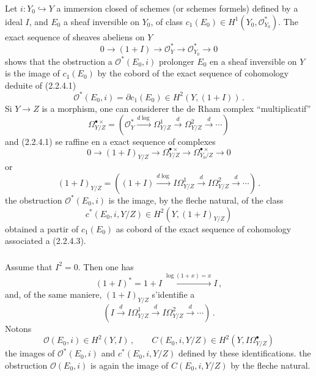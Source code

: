 \documentclass[12pt,a4paper]{article}
\theoremstyle{plain}
\theoremstyle{definition}
\theoremstyle{remark}
\begin{document}
Let $i : Y_0 \hookrightarrow Y$ a immersion closed of schemes (or schemes formels) defined by a ideal $I$, and $E_0$ a sheaf inversible on $Y_0$, of class $c_1(E_0) \in H^1(Y_0, \mathcal{O}_{Y_0}^*)$. The exact sequence of sheaves abeliens on $Y$
\begin{equation}\label{eq:2.2.4.1}
0 \longrightarrow (1+I) \longrightarrow \mathcal{O}_Y^* \longrightarrow \mathcal{O}_{Y_0}^* \longrightarrow 0
\end{equation}
shows that the obstruction a $\mathcal{O}^*(E_0, i)$ prolonger $E_0$ en a sheaf inversible on $Y$ is the image of $c_1(E_0)$ by the cobord of the exact sequence of cohomology deduite of (2.2.4.1)
\begin{equation}\label{eq:2.2.4.2}
\mathcal{O}^*(E_0, i) = \partial c_1(E_0) \in H^2(Y, (1+I))\,.\end{equation}
Si $Y \to Z$ is a morphism, one can considerer the de Rham complex ``multiplicatif''
\[
\Omega_{Y/Z}^{\bullet\times} = (\mathcal{O}_Y^* \xrightarrow{d\log} \Omega_{Y/Z}^1 \xrightarrow{d} \Omega_{Y/Z}^2 \xrightarrow{d} \cdots)
\]
and (2.2.4.1) se raffine en a exact sequence of complexes
\begin{equation}\label{eq:2.2.4.3}
0 \longrightarrow (1+I)_{Y/Z} \longrightarrow \Omega_{Y/Z}^{\bullet\times} \longrightarrow \Omega_{Y_0/Z}^{\bullet\times} \longrightarrow 0
\end{equation}
or
\[
(1+I)_{Y/Z} = ((1+I) \xrightarrow{d\log} I\Omega_{Y/Z}^1 \xrightarrow{d} I\Omega_{Y/Z}^2 \xrightarrow{d} \cdots)\,.\]
the obstruction $\mathcal{O}^*(E_0, i)$ is the image, by the fleche natural, of the class
\begin{equation}\label{eq:2.2.4.4}
c^*(E_0, i, Y/Z) \in H^2(Y, (1+I)_{Y/Z})
\end{equation}
obtained a partir of $c_1(E_0)$ as cobord of the exact sequence of cohomology associated a (2.2.4.3).

\subsubsection{}

Assume that $I^2 = 0$. Then one has
\[
(1+I)^* = 1+I \xrightarrow{\log(1+x) = x} I\,,
\]
and, of the same maniere, $(1+I)_{Y/Z}$ s'identifie a
\[
(I \xrightarrow{d} I\Omega_{Y/Z}^1 \xrightarrow{d} I\Omega_{Y/Z}^2 \xrightarrow{d} \cdots)\,.\]
Notons
\begin{equation}\label{eq:2.2.5.1}
\mathcal{O}(E_0, i) \in H^2(Y, I)\,, \qquad C(E_0, i, Y/Z) \in H^2(Y, I\Omega_{Y/Z}^\bullet)
\end{equation}
the images of $\mathcal{O}^*(E_0, i)$ and $c^*(E_0, i, Y/Z)$ defined by these identifications. the obstruction $\mathcal{O}(E_0, i)$ is again the image of $C(E_0, i, Y/Z)$ by the fleche natural.
\end{document}

